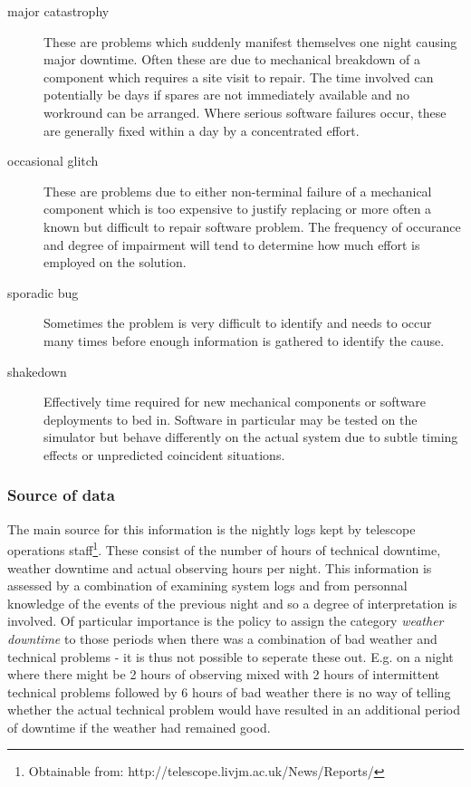 \begin{description}
\item [major catastrophy] These are problems which suddenly manifest themselves one night causing major downtime. Often these are due to mechanical breakdown of a component which requires a site visit to repair. The time involved can potentially be days if spares are not immediately available and no workround can be arranged. Where serious software failures occur, these are generally fixed within a day by a concentrated effort.

\item [occasional glitch] These are problems due to either non-terminal failure of a mechanical component which is too expensive to justify replacing or more often a known but difficult to repair software problem. The frequency of occurance and degree of impairment will tend to determine how much effort is employed on the solution.

\item [sporadic bug] Sometimes the problem is very difficult to identify and needs to occur many times before enough information is gathered to identify the cause. 

\item [shakedown] Effectively time required for new mechanical components or software deployments to bed in. Software in particular may be tested on the simulator but behave differently on the actual system due to subtle timing effects or unpredicted coincident situations.
\end{description}


\subsubsection{Source of data}
The main source for this information is the nightly logs kept by telescope operations staff\footnote{Obtainable from: http://telescope.livjm.ac.uk/News/Reports/}. These consist of the number of hours of technical downtime, weather downtime and actual observing hours per night. This information is assessed by a combination of examining system logs and from personnal knowledge of the events of the previous night and so a degree of interpretation is involved. Of particular importance is the policy to assign the category \emph{weather downtime} to those periods when there was a combination of bad weather and technical problems - it is thus not possible to seperate these out. E.g. on a night where there might be 2 hours of observing mixed with 2 hours of intermittent technical problems followed by 6 hours of bad weather there is no way of telling whether the actual technical problem would have resulted in an additional period of downtime if the weather had remained good. 

